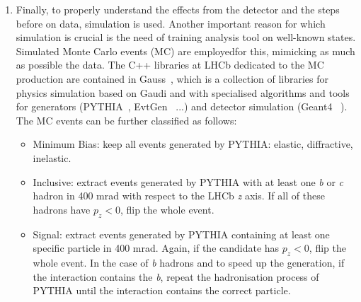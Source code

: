 \begin{enumerate}
\item Finally, to properly understand the effects from the detector and the steps before on data, simulation is used. Another important reason for which simulation is crucial is the need of training analysis tool on well-known states.
Simulated Monte Carlo events (MC) are employedfor this, mimicking as much as possible the data. The C++ libraries at LHCb dedicated to the MC production
are contained in Gauss~\cite{Gauss}, which is a collection of libraries for physics simulation based on Gaudi and with specialised algorithms and tools for generators (PYTHIA~\cite{Sjostrand:2006za}, EvtGen~\cite{Ryd:2005zz} ...) and detector simulation (Geant4 ~\cite{Agostinelli2003250}).
The MC events can be further classified as follows:
\begin{itemize}
\item Minimum Bias: keep all events generated by PYTHIA: elastic, diffractive, inelastic.
\item Inclusive: extract events generated by PYTHIA with at least one \textit{b} or \textit{c} hadron in 400 mrad with respect to the LHCb \textit{z} axis. If all of these hadrons have $p_z < 0$, flip the whole event.
\item Signal: extract events generated by PYTHIA containing at least one specific particle in 400 mrad. Again, if the candidate has $p_z < 0$, flip the whole event. In the case of \textit{b} hadrons and to speed up the generation, if the interaction contains the \textit{b}, repeat the hadronisation process of PYTHIA until the interaction contains the correct particle.
\end{itemize}
\end{enumerate}


		
